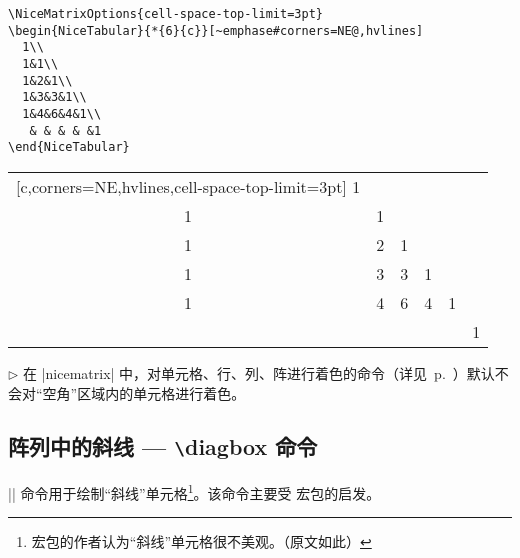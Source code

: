 \documentclass[dvipsnames]{article}%
\begin{document}
\medskip
\begin{BVerbatim}[boxwidth=11cm,baseline=c]
\NiceMatrixOptions{cell-space-top-limit=3pt}
\begin{NiceTabular}{*{6}{c}}[~emphase#corners=NE@,hvlines]
  1\\
  1&1\\
  1&2&1\\
  1&3&3&1\\
  1&4&6&4&1\\
   & & & & &1
\end{NiceTabular}
\end{BVerbatim}
\begin{NiceTabular}{*{6}{c}}[c,corners=NE,hvlines,cell-space-top-limit=3pt]
  1\\
  1&1\\
  1&2&1\\
  1&3&3&1\\
  1&4&6&4&1\\
   & & & & &1
\end{NiceTabular}

\medskip
$\triangleright$ 在 |nicematrix| 中，对单元格、行、列、阵进行着色的命令（详见~p.~\pageref{color-in-code-before}）默认不会对“空角”区域内的单元格进行着色。

\subsection{阵列中的斜线 --- \texttt{\textbackslash}diagbox 命令}
\label{zm:斜线}

|\diagbox| 命令用于绘制“斜线”单元格\footnote{ 宏包的作者认为“斜线”单元格很不美观。（原文如此）}。该命令主要受  宏包的启发。
\end{document}
